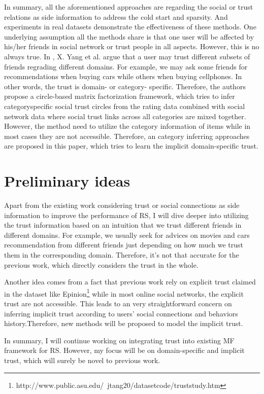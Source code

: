 \documentclass[10pt,onecolumn,conference]{IEEEtran}
\begin{document}
In summary, all the aforementioned approaches are regarding the social or trust relations as side information to address the cold start and sparsity. And experiments in real datasets demonstrate the effectiveness of these methods. One underlying assumption all the methods share is that one user will be affected by his/her friends in social network or trust people in all aspects. However, this is no always true. In \cite{yang2012circle}, X. Yang et al. argue that a user may trust different subsets of friends regrading different domains. For example, we may ask some friends for recommendations when buying cars while others when buying cellphones. In other words, the trust is domain- or category- specific. Therefore, the authors propose a circle-based matrix factorization framework, which tries to infer category\-specific social trust circles from the rating data combined with social network data where social trust links across all categories are mixed together. However, the method need to utilize the category information of items while in most cases they are not accessible. Therefore, an category inferring approaches are proposed in this paper, which tries to learn the implicit domain-specific trust.





\section{Preliminary ideas}
Apart from the existing work considering trust or social connections as side information to improve the performance of RS, I will dive deeper into utilizing the trust information based on an intuition that we trust different friends in different domains. For example, we usually seek for advices on movies and cars recommendation from different friends just depending on how much we trust them in the corresponding domain. Therefore, it's not that accurate for the previous work, which directly considers the trust in the whole.

Another idea comes from a fact that previous work rely on explicit trust claimed in the dataset like Epinion\footnote{http://www.public.asu.edu/~jtang20/datasetcode/truststudy.htm} while in most online social networks, the explicit trust are not accessible. This leads to an very straightforward concern on inferring implicit trust according to users' social connections and behaviors history.Therefore, new methods will be proposed to model the implicit trust.

In summary, I will continue working on integrating trust into existing MF framework for RS. However, my focus will be on domain-specific and implicit trust, which will surely be novel to previous work.



\end{document}
